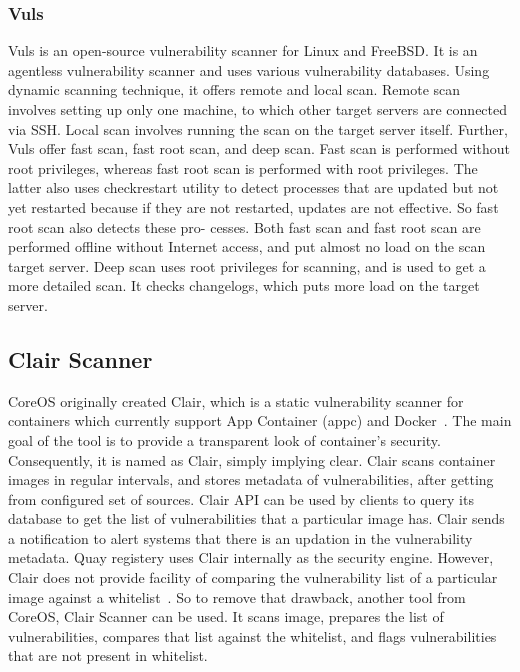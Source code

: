 \documentclass[a4paper,num-refs]{oup-contemporary}
\begin{document}
\subsubsection{Vuls}

Vuls is an open-source vulnerability scanner for Linux and FreeBSD.
It is an agentless vulnerability scanner and uses various
vulnerability databases. Using dynamic scanning technique, it offers
remote and local scan. Remote scan involves setting up only one machine, to
which other target servers are connected via SSH. Local scan involves running
the scan on the target server itself. Further, Vuls offer fast scan, fast root scan,
and deep scan.
Fast scan is performed without root privileges, whereas fast root scan is
performed with root privileges. The latter also uses checkrestart utility to 
detect processes that are updated but not yet restarted because if they are not
restarted, updates are not effective. So fast root scan also detects these pro-
cesses. Both fast scan and fast root scan are performed offline without Internet
access, and put almost no load on the scan target server. Deep scan uses
root privileges for scanning, and is used to get a more detailed scan. It checks
changelogs, which puts more load on the target server.


\subsection{Clair Scanner}

CoreOS originally created Clair, which is a static vulnerability scanner for containers which
currently support App Container (appc) and Docker~\cite{coreos_2019}. The main goal of the
tool is to provide a transparent look of container’s security. Consequently, it is
named as Clair, simply implying clear. Clair scans container images in regular
intervals, and stores metadata of vulnerabilities, after getting from configured
set of sources. Clair API can be used by clients to query its database to get
the list of vulnerabilities that a particular image has. Clair sends a notification
to alert systems that there is an updation in the vulnerability metadata. Quay
registery uses Clair internally as the security engine. However, Clair does not 
provide facility of comparing
the vulnerability list of a particular image against a whitelist~\cite{arminc_2019}. So to remove
that drawback, another tool from CoreOS, Clair Scanner can be used. It scans image, prepares the list of
vulnerabilities, compares that list against the whitelist, and flags vulnerabilities
that are not present in whitelist.
\end{document}
